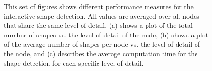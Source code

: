 \begin{figure}
\centering
{}\par\medskip
{}\par\medskip   
{} 
\caption[Performance graphs of the interactive shape detection.]
{This set of figures shows different performance measures for the interactive shape detection. All values are averaged over all nodes that share the same level of detail. (a) shows a plot of the total number of shapes vs. the level of detail of the node, (b) shows a plot of the average number of shapes per node vs. the level of detail of the node, and (c) describes the average computation time for the shape detection for each specific level of detail. }
\label{fig:shape_detection_graphs}
\end{figure}


